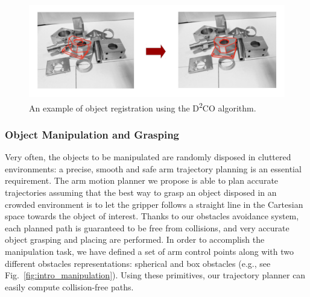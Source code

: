 \documentclass{llncs}
\begin{document}
\begin{figure}[t!]
\begin{center}
\includegraphics[angle=0,width=\linewidth]{images/d2co_02.png}
\end{center}
\caption{An example of object registration using the D\textsuperscript{2}CO algorithm.}\label{fig:sample_d2co}
\end{figure}

\subsubsection{Object Manipulation and Grasping}\label{sec:manipulation}

Very often, the objects to be manipulated are randomly disposed in cluttered environments: a precise, smooth and safe arm trajectory planning is an essential requirement. The arm motion planner we propose is able to plan accurate trajectories assuming that the best way to grasp an object disposed in an crowded environment is to let the gripper follows a straight line in the Cartesian space towards the object of interest. Thanks to our obstacles avoidance system, each planned path is guaranteed to be free from collisions, and very accurate object grasping and placing are performed. In order to accomplish the manipulation task, we have defined a set of arm control points along with two different obstacles representations: spherical and box obstacles (e.g., see Fig.~\ref{fig:intro_manipulation}). Using these primitives, our trajectory planner can easily compute collision-free paths. 
\end{document}
